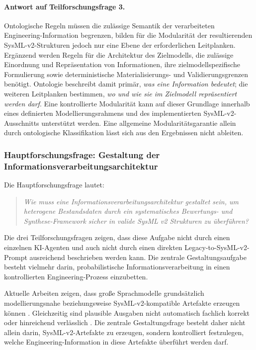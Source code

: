 \paragraph{Antwort auf Teilforschungsfrage 3.}

Ontologische Regeln müssen die zulässige Semantik der verarbeiteten
Engineering-Information begrenzen, bilden für die Modularität der
resultierenden SysML-v2-Strukturen jedoch nur eine Ebene der erforderlichen
Leitplanken. Ergänzend werden Regeln für die Architektur des Zielmodells, die
zulässige Einordnung und Repräsentation von Informationen, ihre
zielmodellspezifische Formulierung sowie deterministische Materialisierungs-
und Validierungsgrenzen benötigt. Ontologie beschreibt damit primär,
\emph{was eine Information bedeutet}; die weiteren Leitplanken bestimmen,
\emph{wo und wie sie im Zielmodell repräsentiert werden darf}. Eine
kontrollierte Modularität kann auf dieser Grundlage innerhalb eines
definierten Modellierungsrahmens und des implementierten
SysML-v2-Ausschnitts unterstützt werden. Eine allgemeine
Modularitätsgarantie allein durch ontologische Klassifikation lässt sich aus
den Ergebnissen nicht ableiten.


\subsubsection{Hauptforschungsfrage: Gestaltung der Informationsverarbeitungsarchitektur}
\label{sec:discussion_main_rq}

Die Hauptforschungsfrage lautet:

\begin{quote}
\textit{Wie muss eine Informationsverarbeitungsarchitektur gestaltet sein, um
heterogene Bestandsdaten durch ein systematisches Bewertungs- und
Synthese-Framework sicher in valide SysML v2 Strukturen zu überführen?}
\end{quote}

Die drei Teilforschungsfragen zeigen, dass diese Aufgabe nicht durch einen
einzelnen KI-Agenten und auch nicht durch einen direkten
Legacy-to-SysML-v2-Prompt ausreichend beschrieben werden kann. Die zentrale
Gestaltungsaufgabe besteht vielmehr darin, probabilistische
Informationsverarbeitung in einen kontrollierten Engineering-Prozess
einzubetten.

Aktuelle Arbeiten zeigen, dass große Sprachmodelle grundsätzlich
modellierungsnahe beziehungsweise SysML-v2-kompatible Artefakte erzeugen
können \cite{Stein2026,Pan.2025,Cibrian.2025}. Gleichzeitig sind plausible
Ausgaben nicht automatisch fachlich korrekt oder hinreichend verlässlich
\cite{Topcu2025}. Die zentrale Gestaltungsfrage
besteht daher nicht allein darin, SysML-v2-Artefakte zu erzeugen, sondern
kontrolliert festzulegen, welche Engineering-Information in diese Artefakte
überführt werden darf.

